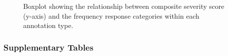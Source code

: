 \documentclass[
]{agujournal2019}
\begin{document}
\label{cell-fig-severity-boxplot}
\begin{figure}[H]


\caption{\label{fig-severity-boxplot}Boxplot showing the relationship
between composite severity score (y-axis) and the frequency response
categories within each annotation type.}

\end{figure}%

\newpage{}

\subsubsection{Supplementary Tables}\label{supplementary-tables}
\end{document}

